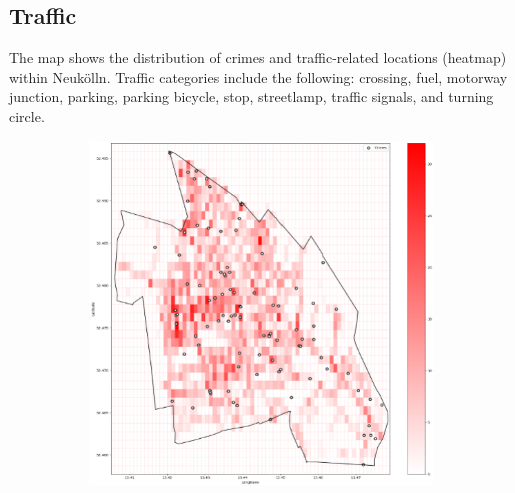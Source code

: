 \subsection{Traffic}
The map shows the distribution of crimes and traffic-related locations (heatmap) within Neukölln. Traffic categories include the following: crossing, fuel, motorway junction, parking, parking bicycle, stop, streetlamp, traffic signals, and turning circle. 
\begin{figure}[h]
    \centering
    \begin{subfigure}[b]{0.45\textwidth}
        \centering
        \includegraphics[width=\textwidth]{./figures/Gerard/traffic.png}
        \caption{}
        \label{fig:image1}
    \end{subfigure}
    \hfill
    \begin{subfigure}[b]{0.45\textwidth}
        \centering

\end{subfigure}
\end{figure}
